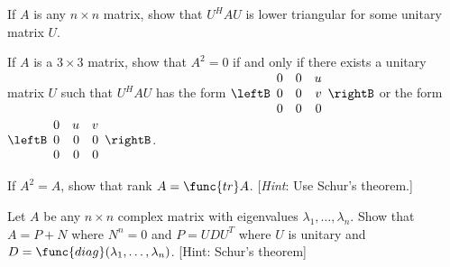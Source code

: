 \begin{multicols}{2}
\begin{ex}
\begin{sol}
\begin{enumerate}[label={\alph*.}]
\end{enumerate}
\end{sol}
\end{ex}

\begin{ex}
If $A$ is any $n \times n$ matrix, show that $U^{H}AU$ is lower triangular for some unitary matrix $U$.
\end{ex}

\begin{ex}
If $A$ is a $3 \times 3$ matrix, show that $A^{2} = 0$ if and only if there exists a unitary matrix $U$ such that $U^{H}AU$ has the form $\leftB \begin{array}{rrr}
0 & 0 & u \\
0 & 0 & v \\
0 & 0 & 0
\end{array}\rightB$
or the form $\leftB \begin{array}{rrr}
0 & u & v \\
0 & 0 & 0 \\
0 & 0 & 0
\end{array}\rightB$.
\end{ex}

\begin{ex}
If $A^{2} = A$, show that rank $A = \func{tr}A$. [\textit{Hint}: Use Schur's theorem.]
\end{ex}

\begin{ex}
Let $A$ be any $n \times n$ complex matrix with eigenvalues $\lambda_1, \dots, \lambda_n$. Show that $A = P+N$ where $N^{n}=0$ and $P=UDU^{T}$ where $U$ is unitary and $D=\func{diag}(\lambda_1,\dots,\lambda_{n})$. [Hint: Schur's theorem]
\end{ex}
\end{multicols}
